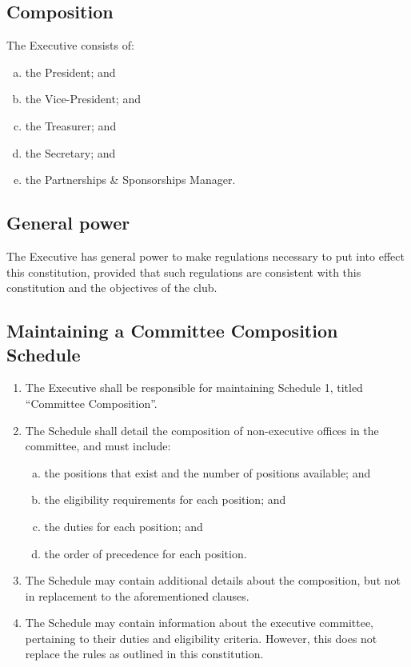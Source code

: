 \documentclass{constitution}
\begin{document}
\subsection{Composition}
The Executive consists of:
\begin{enumerate}[(a)]
    \item the President; and
    \item the Vice-President; and
    \item the Treasurer; and
    \item the Secretary; and
    \item the Partnerships \& Sponsorships Manager.
\end{enumerate}

\subsection{General power}
The Executive has general power to make regulations necessary to put into effect this constitution, provided that such regulations are consistent with this constitution and the objectives of the club.

\subsection{Maintaining a Committee Composition Schedule}\label{schedule1}
\begin{enumerate}[(1)]
    \item The Executive shall be responsible for maintaining Schedule 1, titled ``Committee Composition''.
    \item The Schedule shall detail the composition of non-executive offices in the committee, and must include:
          \begin{enumerate}[(a)]
              \item the positions that exist and the number of positions available; and
              \item the eligibility requirements for each position; and
              \item the duties for each position; and
              \item the order of precedence for each position.
          \end{enumerate}
    \item The Schedule may contain additional details about the composition, but not in replacement to the aforementioned clauses.
    \item The Schedule may contain information about the executive committee, pertaining to their duties and eligibility criteria. However, this does not replace the rules as outlined in this constitution.
\end{enumerate}
\end{document}
